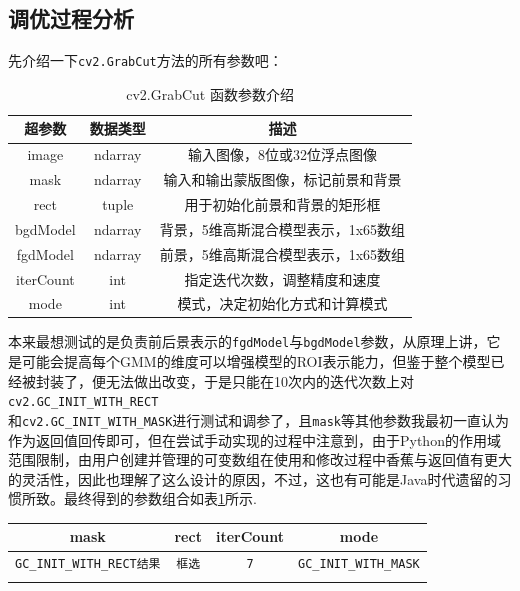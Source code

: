 \documentclass[UTF8]{ctexart}
\begin{document}
\subsection{调优过程分析}
先介绍一下\verb|cv2.GrabCut|方法的所有参数吧：\par
\begin{table}[htbp]
\centering
\begin{tabular}{ccc}
\toprule[1.5pt]
\textbf{超参数} & \textbf{数据类型} & \textbf{描述} \\
\midrule
image & ndarray & 输入图像，8位或32位浮点图像 \\
mask & ndarray & 输入和输出蒙版图像，标记前景和背景 \\
rect & tuple & 用于初始化前景和背景的矩形框 \\
bgdModel & ndarray & 背景，5维高斯混合模型表示，1x65数组 \\
fgdModel & ndarray & 前景，5维高斯混合模型表示，1x65数组 \\
iterCount & int & 指定迭代次数，调整精度和速度 \\
mode & int & 模式，决定初始化方式和计算模式 \\
\bottomrule[1.5pt]
\end{tabular}
\caption{cv2.GrabCut 函数参数介绍}
\end{table}
本来最想测试的是负责前后景表示的\verb|fgdModel|与\verb|bgdModel|参数，从原理上讲，它是可能会提高每个GMM的维度可以增强模型的ROI表示能力，但鉴于整个模型已经被封装了，便无法做出改变，于是只能在10次内的迭代次数上对\verb|cv2.GC_INIT_WITH_RECT|\\和\verb|cv2.GC_INIT_WITH_MASK|进行测试和调参了，且\verb|mask|等其他参数我最初一直认为作为返回值回传即可，但在尝试手动实现的过程中注意到，由于Python的作用域范围限制，由用户创建并管理的可变数组在使用和修改过程中香蕉与返回值有更大的灵活性，因此也理解了这么设计的原因，不过，这也有可能是Java时代遗留的习惯所致。最终得到的参数组合如表\ref{tab:params}所示.

\begin{table}[htbp]
\centering
\begin{tabular}{cccc}
\toprule[1.5pt]
\textbf{mask} & \textbf{rect} & \textbf{iterCount} & \textbf{mode}\\
\midrule
\verb|GC_INIT_WITH_RECT结果| & \verb|框选| & \verb|7| & \verb|GC_INIT_WITH_MASK|\\
\bottomrule[1.5pt]
\label{tab:params}
\end{tabular}
\end{table}
\end{document}

